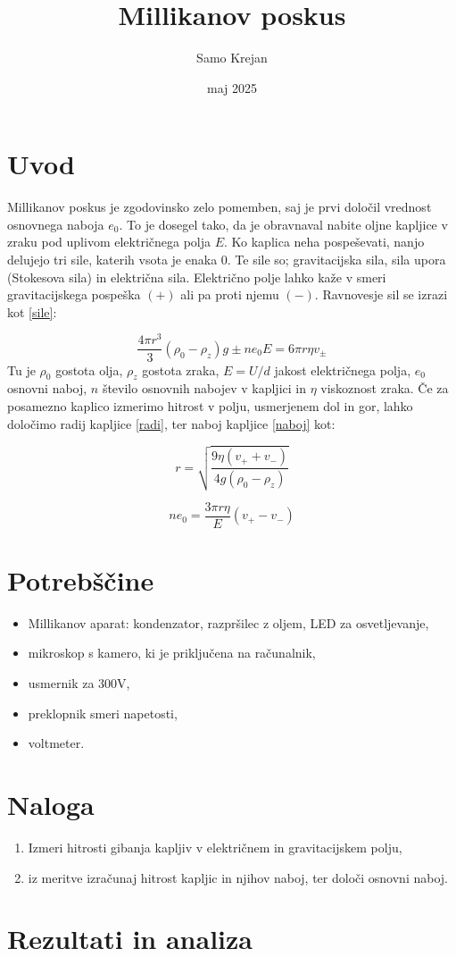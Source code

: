 \documentclass[12pt]{article}
\title{\textbf{Millikanov poskus}}
\author{Samo Krejan}
\date{maj 2025}
\begin{document}
\maketitle

\section{Uvod}

Millikanov poskus je zgodovinsko zelo pomemben, saj je prvi določil vrednost osnovnega naboja $e_0$. To je dosegel tako, da je obravnaval nabite oljne kapljice v zraku pod uplivom električnega polja $E$. Ko kaplica neha pospeševati, nanjo delujejo tri sile, katerih vsota je enaka $0$. Te sile so; gravitacijska sila, sila upora (Stokesova sila) in električna sila. Električno polje lahko kaže v smeri gravitacijskega pospeška $(+)$ ali pa proti njemu $(-).$ Ravnovesje sil se izrazi kot \ref{sile}:

\begin{equation}
    \frac{4\pi r^3}{3} (\rho_0-\rho_z)g \pm n e_0 E = 6\pi r \eta v_\pm
    \label{sile}
\end{equation}
Tu je $\rho_0$ gostota olja, $\rho_z$ gostota zraka, $E = U/d$ jakost električnega polja, $e_0$ osnovni naboj, $n$ število osnovnih nabojev v kapljici in $\eta$ viskoznost zraka. Če za posamezno kaplico izmerimo hitrost v polju, usmerjenem dol in gor, lahko določimo radij kapljice \ref{radi}, ter naboj kapljice \ref{naboj} kot:

\begin{equation}
    r = \sqrt{\frac{9 \eta (v_+ + v_-)}{4g(\rho_0-\rho_z)}}
    \label{radi}
\end{equation}

\begin{equation}
    ne_0 = \frac{3\pi r \eta}{E}(v_+ - v_-)
    \label{naboj}
\end{equation}

\section{Potrebščine}

\begin{itemize}
    \item Millikanov aparat: kondenzator, razpršilec z oljem, LED za osvetljevanje,
    \item mikroskop s kamero, ki je priključena na računalnik,
    \item usmernik za 300V,
    \item preklopnik smeri napetosti,
    \item voltmeter.
\end{itemize}


\section{Naloga}

\begin{enumerate}
    \item Izmeri hitrosti gibanja kapljiv v električnem in gravitacijskem polju,
    \item iz meritve izračunaj hitrost kapljic in njihov naboj, ter določi osnovni naboj.
\end{enumerate}


\section{Rezultati in analiza}
\end{document}
